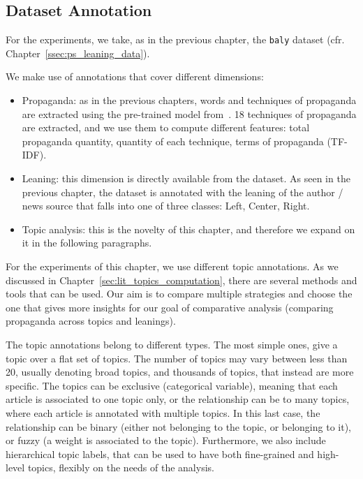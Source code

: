 \subsection{\statusgreen Dataset Annotation}
\label{sec:topic_method_data}

For the experiments, we take, as in the previous chapter, the \texttt{baly} dataset (cfr. Chapter~\ref{ssec:ps_leaning_data}).

We make use of annotations that cover different dimensions:
\begin{itemize}
    \item Propaganda: as in the previous chapters, words and techniques of propaganda are extracted using the pre-trained model from~\cite{da2019fine}. 18 techniques of propaganda are extracted, and we use them to compute different features: total propaganda quantity, quantity of each technique, terms of propaganda (TF-IDF).
    \item Leaning: this dimension is directly available from the dataset. As seen in the previous chapter, the dataset is annotated with the leaning of the author / news source that falls into one of three classes: Left, Center, Right.
    \item Topic analysis: this is the novelty of this chapter, and therefore we expand on it in the following paragraphs. %
\end{itemize}



For the experiments of this chapter, we use different topic annotations. As we discussed in Chapter~\ref{sec:lit_topics_computation}, there are several methods and tools that can be used.
Our aim is to compare multiple strategies and choose the one that gives more insights for our goal of comparative analysis (comparing propaganda across topics and leanings).

The topic annotations belong to different types. The most simple ones, give a topic over a flat set of topics. The number of topics may vary between less than 20, usually denoting broad topics, and thousands of topics, that instead are more specific.
The topics can be exclusive (categorical variable), meaning that each article is associated to one topic only, or the relationship can be to many topics, where each article is annotated with multiple topics. In this last case, the relationship can be binary (either not belonging to the topic, or belonging to it), or fuzzy (a weight is associated to the topic).
Furthermore, we also include hierarchical topic labels, that can be used to have both fine-grained and high-level topics, flexibly on the needs of the analysis.

